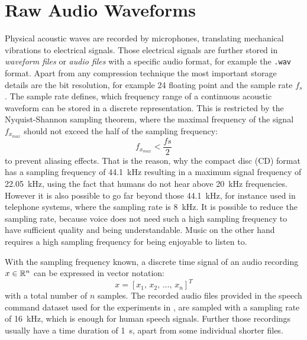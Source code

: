 
\section{Raw Audio Waveforms}\label{sec:signal_raw}
\thesisStateReady
Physical acoustic waves are recorded by microphones, translating mechanical vibrations to electrical signals. 
Those electrical signals are further stored in \emph{waveform files} or \emph{audio files} with a specific audio format, for example the \texttt{.wav} format.
Apart from any compression technique the most important storage details are the bit resolution, for example \SI{24}{\bit} floating point and the sample rate $f_s$. 
The sample rate defines, which frequency range of a continuous acoustic waveform can be stored in a discrete representation.
This is restricted by the Nyquist-Shannon sampling theorem, where the maximal frequency of the signal $f_{x_{max}}$ should not exceed the half of the sampling frequency: 
\begin{equation}\label{eq:signal_raw_nyquist}
  f_{x_{max}} < \frac{fs}{2}
\end{equation}
to prevent aliasing effects.
That is the reason, why the compact disc (CD) format has a sampling frequency of \SI{44.1}{\kilo\hertz} resulting in a maximum signal frequency of \SI{22.05}{\kilo\hertz}, using the fact that humans do not hear above \SI{20}{\kilo\hertz} frequencies.
However it is also possible to go far beyond those \SI{44.1}{\kilo\hertz}, for instance used in telephone systems, where the sampling rate is \SI{8}{\kilo\hertz}.
It is possible to reduce the sampling rate, because voice does not need such a high sampling frequency to have sufficient quality and being understandable.
Music on the other hand requires a high sampling frequency for being enjoyable to listen to.

With the sampling frequency known, a discrete time signal of an audio recording $x \in \mathbb{R}^n$ can be expressed in vector notation:
\begin{equation}\label{eq:signal_raw_x}
  x = [x_1,\, x_2,\, \dots,\, x_n]^T
\end{equation}
with a total number of $n$ samples.
The recorded audio files provided in the speech command dataset \cite{Warden2018} used for the experiments in , are sampled with a sampling rate of \SI{16}{\kilo\hertz}, which is enough for human speech signals.
Further those recordings usually have a time duration of \SI{1}{\second}, apart from some individual shorter files.

